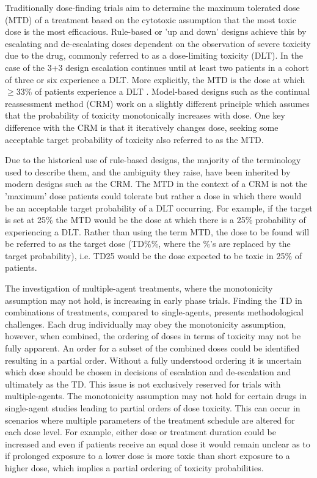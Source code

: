 Traditionally dose-finding trials aim to determine the maximum tolerated dose (MTD) of a treatment based on the cytotoxic assumption that the most toxic dose is the most efficacious. Rule-based or 'up and down' designs achieve this by escalating and de-escalating doses dependent on the observation of severe toxicity due to the drug,  commonly referred to as a dose-limiting toxicity (DLT). In the case of the 3+3 design escalation continues until at least two patients in a cohort of three or six experience a DLT. More explicitly, the MTD is the dose at which $\geq$33\% of patients experience a DLT \cite{letourneauDoseEscalationMethods2009}. Model-based designs such as the continual reassessment method (CRM) \cite{oquigleyContinualReassessmentMethod1990} work on a slightly different principle which assumes that the probability of toxicity monotonically increases with dose. One key difference with the CRM is that it iteratively changes dose, seeking some acceptable target probability of toxicity also referred to as the MTD. 

Due to the historical use of rule-based designs, the majority of the terminology used to describe them, and the ambiguity they raise, have been inherited by modern designs such as the CRM. The MTD in the context of a CRM is not the 'maximum' dose patients could tolerate but rather a dose in which there would be an acceptable target probability of a DLT occurring. For example, if the target is set at 25\% the MTD would be the dose at which there is a 25\% probability of experiencing a DLT. Rather than using the term MTD, the dose to be found will be referred to as the target dose (TD\%\%, where the \%'s are replaced by the target probability), i.e. TD25 would be the dose expected to be toxic in 25\% of patients.

The investigation of multiple-agent treatments, where the monotonicity assumption may not hold, is increasing in early phase trials. Finding the TD in combinations of treatments, compared to single-agents,  presents methodological challenges. Each drug individually may obey the monotonicity assumption, however, when combined, the ordering of doses in terms of toxicity may not be fully apparent. An order for a subset of the combined doses could be identified resulting in a partial order. Without a fully understood ordering it is uncertain which dose should be chosen in decisions of escalation and de-escalation and ultimately as the TD. This issue is not exclusively reserved for trials with multiple-agents. The monotonicity assumption may not hold for certain drugs in single-agent studies leading to partial orders of dose toxicity. This can occur in scenarios where multiple parameters of the treatment schedule are altered for each dose level. For example, either dose or treatment duration could be increased and even if patients receive an equal dose it would remain unclear as to if prolonged exposure to a lower dose is more toxic than short exposure to a higher dose, which implies a partial ordering of toxicity probabilities. 

